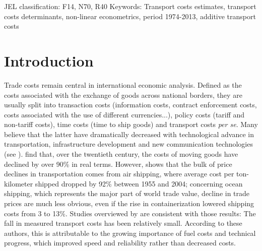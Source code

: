 \documentclass[a4paper,11pt]{article}
\begin{document}
\thispagestyle{empty} \pagestyle{plain} \setcounter{page}{1}



{\normalsize JEL classification: F14, N70, R40\newline
Keywords: Transport costs estimates, transport costs determinants, non-linear econometrics, period 1974-2013, additive transport costs }

{\normalsize \vspace{0cm} }

{\normalsize \titlepage }

{\normalsize \newpage }


\section{Introduction}


\noindent Trade costs remain central in international economic analysis. Defined as the costs associated with the exchange of goods across national borders, they are usually split into transaction costs (information costs, contract enforcement costs, costs associated with the use of different currencies...), policy costs (tariff  and non-tariff costs), time costs (time to ship goods) and transport costs \emph{per se}. Many believe that the latter have dramatically decreased with technological advance in transportation, infrastructure development and new communication technologies (see \citealp{Lafourcade_Thisse}). \citet{Glaeser04} find that, over the twentieth century, the costs of moving goods have declined by over 90\% in real terms. However, \citet{hummels2007} shows that the bulk of price declines in transportation comes from air shipping, where average cost per ton-kilometer shipped dropped by 92\% between 1955 and 2004; concerning ocean shipping, which represents the major part of world trade value, decline in trade prices are much less obvious, even if the rise in containerization lowered shipping costs from 3 to 13\%. Studies overviewed by \citet{Behar_Venables} are consistent with those results: The fall in measured transport costs has been relatively small. According to these authors, this is attributable to the growing importance of fuel costs and technical progress, which improved speed and reliability rather than decreased costs.\smallskip
\end{document}
